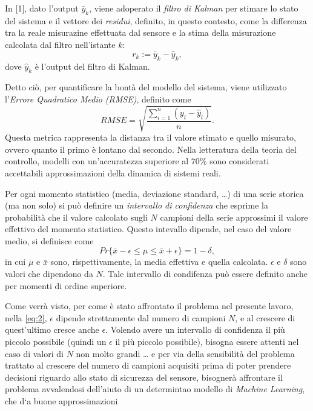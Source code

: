 \documentclass[Lau,binding=0.6cm]{sapthesis}
\begin{document}
In [1], dato l'output $\bar{y}_k$, viene adoperato il \textit{filtro di Kalman} per stimare lo stato del sistema e il vettore dei \textit{residui}, definito, in questo contesto, come la differenza tra la reale misurazine effettuata dal sensore
e la stima della misurazione calcolata dal filtro nell'istante $k$:
\begin{equation}
    r_k := \bar{y}_k - \hat{y}_k,
\end{equation}
dove $\hat{y}_k$ \`e l'output del filtro di Kalman.

Detto ci\`o, per quantificare la bont\`a del modello del sistema, viene utilizzato l'\textit{Errore Quadratico Medio (RMSE)}, definito come
\begin{equation}
    RMSE = \sqrt{\frac{\sum_{i=1}^n (y_i - \hat{y}_i)}{n}}.
\end{equation}
Questa metrica rappresenta la distanza tra il valore stimato e quello misurato, ovvero quanto il primo \`e lontano dal secondo.
Nella letteratura della teoria del controllo, modelli con un'accuratezza superiore al 70\% sono considerati accettabili approssimazioni della dinamica di sistemi reali.

Per ogni momento statistico (media, deviazione standard, \ldots) di una serie storica (ma non solo) si pu\`o definire un \textit{intervallo di confidenza} 
che esprime la probabilit\`a che il valore calcolato sugli $N$ campioni della serie approssimi il valore effettivo del momento statistico.
Questo intevallo dipende, nel caso del valore medio, si definisce come 
\begin{equation}
    Pr\{\bar{x} - \epsilon \leq \mu \leq \bar{x} + \epsilon\} = 1 - \delta,
    \label{eq:2}
\end{equation}
in cui $\mu$ e $\bar{x}$ sono, rispettivamente, la media effettiva e quella calcolata. $\epsilon$ e $\delta$ sono valori che dipendono da $N$.
Tale intervallo di condifenza pu\`o essere definito anche per momenti di ordine superiore.

Come verr\`a visto, per come \`e stato affrontato il problema nel presente lavoro, nella \ref{eq:2}, $\epsilon$ dipende strettamente dal numero di campioni $N$, e al crescere di quest'ultimo cresce anche $\epsilon$.
Volendo avere un intervallo di confidenza il pi\`u piccolo possibile (quindi un $\epsilon$ il pi\`u piccolo possibile), bisogna essere attenti nel caso di valori di $N$ non molto grandi \ldots
e per via della sensibilit\`a del problema trattato al crescere del numero di campioni acquisiti prima di poter prendere decisioni riguardo allo stato di sicurezza del sensore, 
bisogner\`a affrontare il problema avvalendosi dell'aiuto di un determintao modello di \textit{Machine Learning}, che d`a buone approssimazioni
\end{document}
